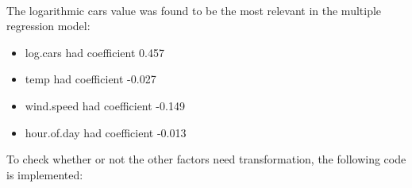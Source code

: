 \documentclass[11pt]{article}
\providecommand{\tightlist}{%
      \setlength{\itemsep}{0pt}\setlength{\parskip}{0pt}}
\begin{document}
    \begin{center}
    \end{center}
    { \hspace*{\fill} \\}
    
    The logarithmic cars value was found to be the most relevant in the
multiple regression model:

\begin{itemize}
\tightlist
\item
  log.cars had coefficient 0.457
\item
  temp had coefficient -0.027
\item
  wind.speed had coefficient -0.149
\item
  hour.of.day had coefficient -0.013
\end{itemize}

To check whether or not the other factors need transformation, the
following code is implemented:
\end{document}
